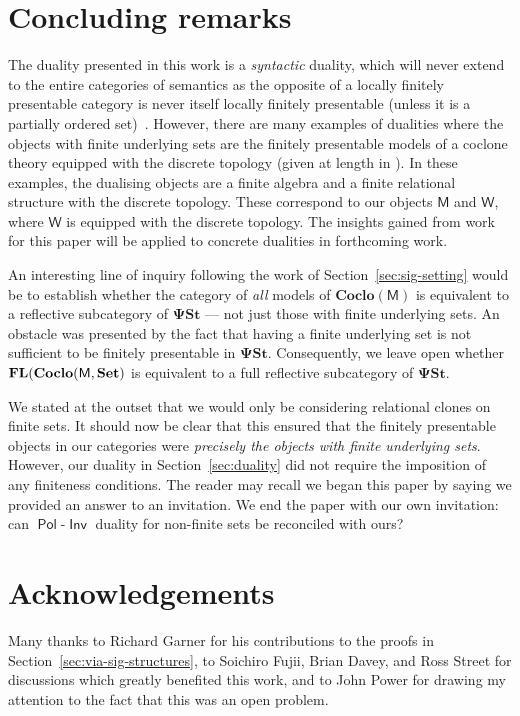 \documentclass[11pt, a4paper, twoside,leqno]{amsart}
\newcommand{\cat}[1]{\mathbf{#1}}
\numberwithin{equation}{section}
\theoremstyle{plain}
\theoremstyle{definition}
\newcommand{\Set}{\cat{Set}}
\DeclareMathOperator{\FL}{\bf FL}
\DeclareMathOperator{\Pol}{\mathsf{Pol}}
\DeclareMathOperator{\Inv}{\mathsf{Inv}}
\begin{document}
\section{Concluding remarks}
\label{sec:concluding-remarks}

The duality presented in this work is a \emph{syntactic} duality,
which will never extend to the entire categories of semantics as the opposite of
a locally finitely presentable category is never itself locally
finitely presentable (unless it is a partially ordered
set)~\cite{Gabriel:1971aa}. However, there are many examples of dualities where the objects with finite underlying
sets are the finitely presentable models of a coclone
theory equipped with the discrete topology (given at length in \cite{Clark:1998aa}). In these examples, the
dualising objects are a finite algebra and a finite relational
structure with the discrete topology. These correspond to our objects
\(\mathsf{M}\) and \(\mathsf{W}\), where \(\mathsf{W}\) is equipped
with the discrete topology.
The insights
gained from work for this paper will be applied to concrete dualities in forthcoming work.

An interesting line of inquiry following the work of Section~\ref{sec:sig-setting}
would be to establish whether the category of
\emph{all} models of \(\cat{Coclo}(\mathsf{M})\) is equivalent to a reflective
subcategory of \(\cat{\Psi St}\) --- not just those with finite
underlying sets. An obstacle was presented by the fact
that having a finite underlying set is not sufficient to be finitely
presentable in \(\cat{\Psi St}\). Consequently, we leave open whether
\(\FL(\cat{Coclo}(\mathsf{M},\Set)\) is equivalent to a full
reflective subcategory of \(\cat{\Psi St}\).

We stated at the outset that we would only be considering relational
clones 
on finite sets.
It should now be clear that this ensured that the finitely presentable
objects in our categories were \emph{precisely the objects with finite
  underlying sets}. However, our duality in Section~\ref{sec:duality} did not require the imposition
of any finiteness conditions. The reader may recall we began this paper by saying we provided an answer
to an invitation. We end the
paper with our own invitation: can
\(\Pol\)-\(\Inv\) duality for non-finite
sets be reconciled with ours?


\section*{Acknowledgements}
Many thanks to Richard Garner for his contributions to the proofs in Section~\ref{sec:via-sig-structures}, to Soichiro Fujii, Brian Davey,
and Ross Street for discussions which greatly benefited this work, and
to John Power for drawing my attention to the fact that this was an open problem.



 
\end{document}
